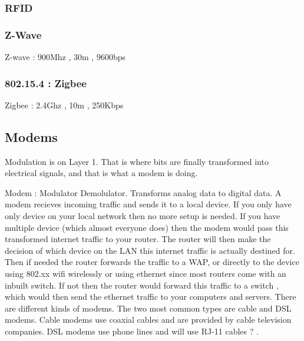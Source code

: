 \subsubsectionend

\subsubsection{RFID}
\label{sssec:rfid}



\subsubsectionend

\subsubsection{Z-Wave}
\label{sssec:z_wave}

Z-wave : 900Mhz , 30m , 9600bps

\subsubsectionend

\subsubsection{802.15.4 : Zigbee}
\label{sssec:802_15_4_zigbee}


Zigbee : 2.4Ghz , 10m , 250Kbps

\subsubsectionend

\subsectionend

\subsection{Modems}
\label{ssec:modems}

Modulation is on Layer 1. That is where bits are finally transformed into electrical signals, and that is what a modem is doing.

Modem : Modulator Demolulator. Transforms analog data to digital data. A modem
recieves incoming traffic and sends it to a local device. If you only have only
device on your local network then no more setup is needed. If you have multiple
device (which almost everyone does) then the modem would pass this transformed
internet traffic to your router. The router will then make the decision of which
device on the LAN this internet traffic is actually destined for. Then if needed
the router forwards the traffic to a WAP, or directly to the device using 802.xx
wifi wirelessly or using ethernet since most routers come with an inbuilt
switch. If not then the router would forward this traffic to a switch , which
would then send the ethernet traffic to your computers and servers.
There are different kinds of modems. The two most common types are cable and DSL
modems. Cable modems use coaxial cables and are provided by cable television
companies. DSL modems use phone lines and will use RJ-11 cables ? .

